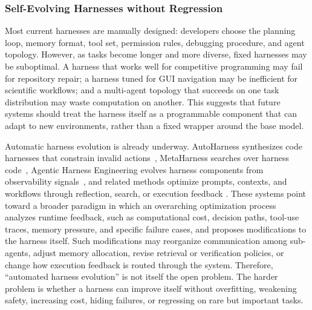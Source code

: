 \documentclass{llmxive}
\begin{document}
\subsubsection{Self-Evolving Harnesses without Regression}

Most current harnesses are manually designed: developers choose the planning loop, memory format, tool set, permission rules, debugging procedure, and agent topology. However, as tasks become longer and more diverse, fixed harnesses may be suboptimal. A harness that works well for competitive programming may fail for repository repair; a harness tuned for GUI navigation may be inefficient for scientific workflows; and a multi-agent topology that succeeds on one task distribution may waste computation on another. This suggests that future systems should treat the harness itself as a programmable component that can adapt to new environments, rather than a fixed wrapper around the base model.

Automatic harness evolution is already underway. AutoHarness synthesizes code harnesses that constrain invalid actions~\citep{lou2026autoharness}, MetaHarness searches over harness code~\citep{lee2026metaharness}, Agentic Harness Engineering evolves harness components from observability signals~\citep{lin2026agentic}, and related methods optimize prompts, contexts, and workflows through reflection, search, or execution feedback \citep{agrawal2025gepa,Liu2025SEW,zhang2025agentic}. These systems point toward a broader paradigm in which an overarching optimization process analyzes runtime feedback, such as computational cost, decision paths, tool-use traces, memory pressure, and specific failure cases, and proposes modifications to the harness itself. Such modifications may reorganize communication among sub-agents, adjust memory allocation, revise retrieval or verification policies, or change how execution feedback is routed through the system. Therefore, ``automated harness evolution'' is not itself the open problem. The harder problem is whether a harness can improve itself without overfitting, weakening safety, increasing cost, hiding failures, or regressing on rare but important tasks.
\end{document}
